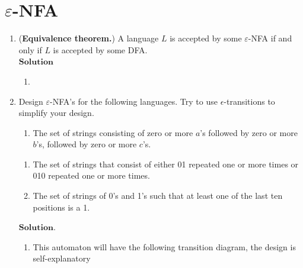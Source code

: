 \documentclass{article}
\theoremstyle{remark}
\begin{document}
\section*{$\varepsilon$-NFA}
\begin{enumerate}
    \item (\textbf{Equivalence theorem.}) A language $L$ is accepted by 
    some $\varepsilon$-NFA if and only if $L$ is accepted by some DFA.
    \\$\textbf{Solution}$
    \begin{enumerate}
        \item[$(\implies)$]
    \end{enumerate}

    \item Design $\varepsilon$-NFA's for the following languages. Try to use $\epsilon$-transitions to simplify your design.

    \begin{enumerate}
        \item[(a)] The set of strings consisting of zero or more $a$'s followed by zero or more $b$'s, followed by zero or more $c$'s.
    \end{enumerate}
    
    \begin{enumerate}
        \item[(b)] The set of strings that consist of either 01 repeated one or more times or 010 repeated one or more times.
        
        \item[(c)] The set of strings of 0's and 1's such that at least one of the last ten positions is a 1.
    \end{enumerate}
    $\textbf{Solution.}$
    \begin{enumerate}
        \item This automaton will have the following transition diagram, the design is self-explanatory
        \begin{center}
\end{center}
\end{enumerate}
\end{enumerate}
\end{document}
